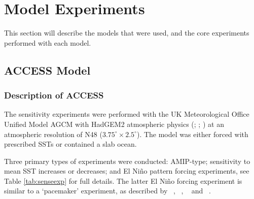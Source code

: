 \section{Model Experiments}

This section will describe the models that were used, and the core experiments 
performed with each model.


\subsection{ACCESS Model}

\subsubsection{Description of ACCESS}
The sensitivity experiments were performed with the UK Meteorological Office 
Unified Model AGCM with HadGEM2 atmospheric physics (\citet{Davies2005}; 
\citet{Martin2010}; \citet{Bellouin2011}) at an atmospheric resolution of N48 
($3.75^{\circ} \times 2.5^{\circ}$). The model was either forced with prescribed 
SSTs or contained a slab ocean. 

Three primary types of experiments were conducted: AMIP-type; sensitivity to 
mean SST increases or decreases; and El Ni{\~n}o pattern forcing experiments, 
see Table \ref{tab:senseexp} for full details. The latter El Ni{\~n}o forcing 
experiment is similar to a `pacemaker' experiment, as described by 
~\citealt{Alexander1992}, ~\citealt{Alexander1992a}, ~\citealt{Lau2000} and 
~\citealt{Lu2011}. 

